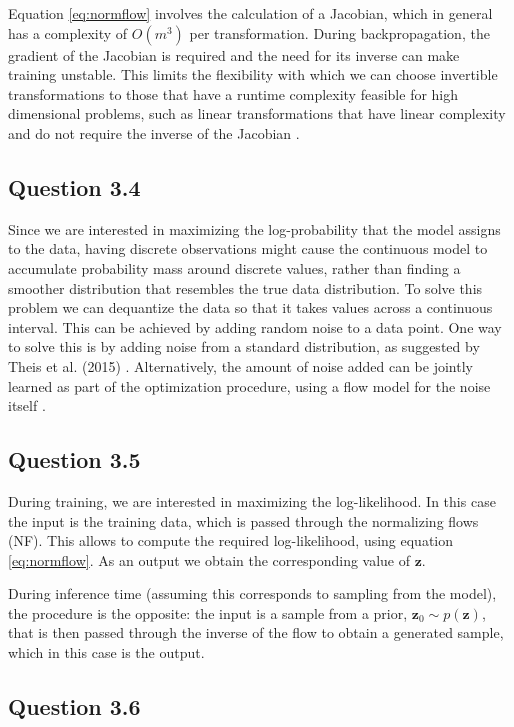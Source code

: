 \documentclass{article}
\begin{document}
Equation \ref{eq:normflow} involves the calculation of a Jacobian, which in general has a complexity of $O(m^3)$ per transformation. During backpropagation, the gradient of the Jacobian is required and the need for its inverse can make training unstable. This limits the flexibility with which we can choose invertible transformations to those that have a runtime complexity feasible for high dimensional problems, such as linear transformations that have linear complexity and do not require the inverse of the Jacobian \cite{rezende2015flows}.

\subsection*{Question 3.4}

Since we are interested in maximizing the log-probability that the model assigns to the data, having discrete observations might cause the continuous model to accumulate probability mass around discrete values, rather than finding a smoother distribution that resembles the true data distribution. To solve this problem we can dequantize the data so that it takes values across a continuous interval. This can be achieved by adding random noise to a data point. One way to solve this is by adding noise from a standard distribution, as suggested by Theis et al. (2015) \cite{theis2016evaluation}. Alternatively, the amount of noise added can be jointly learned as part of the optimization procedure, using a flow model for the noise itself \cite{ho2019flow}.

\subsection*{Question 3.5}

During training, we are interested in maximizing the log-likelihood. In this case the input is the training data, which is passed through the normalizing flows (NF). This allows to compute the required log-likelihood, using equation \ref{eq:normflow}. As an output we obtain the corresponding value of $\mathbf{z}$.

During inference time (assuming this corresponds to sampling from the model), the procedure is the opposite: the input is a sample from a prior, $\mathbf{z}_0\sim p(\mathbf{z})$, that is then passed through the inverse of the flow to obtain a generated sample, which in this case is the output. 

\subsection*{Question 3.6}
\end{document}
